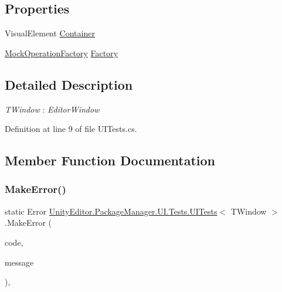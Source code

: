 \subsection*{Properties}
\begin{DoxyCompactItemize}
\item 
Visual\+Element \mbox{\hyperlink{class_unity_editor_1_1_package_manager_1_1_u_i_1_1_tests_1_1_u_i_tests_a85feae7c0dc564b712cab9392bd14e68}{Container}}
\item 
\mbox{\hyperlink{class_unity_editor_1_1_package_manager_1_1_u_i_1_1_tests_1_1_mock_operation_factory}{Mock\+Operation\+Factory}} \mbox{\hyperlink{class_unity_editor_1_1_package_manager_1_1_u_i_1_1_tests_1_1_u_i_tests_a21922bd694662931ee9b893f1734305f}{Factory}}
\end{DoxyCompactItemize}


\subsection{Detailed Description}
\begin{Desc}
\item[Type Constraints]\begin{description}
\item[{\em T\+Window} : {\em Editor\+Window}]\end{description}
\end{Desc}


Definition at line 9 of file U\+I\+Tests.\+cs.



\subsection{Member Function Documentation}
\mbox{\label{class_unity_editor_1_1_package_manager_1_1_u_i_1_1_tests_1_1_u_i_tests_a87def7aa22c1e0676f7621df8b18594e}} 
\subsubsection{\texorpdfstring{MakeError()}{MakeError()}}
{\footnotesize\ttfamily static Error \mbox{\hyperlink{class_unity_editor_1_1_package_manager_1_1_u_i_1_1_tests_1_1_u_i_tests}{Unity\+Editor.\+Package\+Manager.\+U\+I.\+Tests.\+U\+I\+Tests}}$<$ T\+Window $>$.Make\+Error (\begin{DoxyParamCaption}\item[{Error\+Code}]{code,  }\item[{string}]{message }\end{DoxyParamCaption})\hspace{0.3cm}{\ttfamily [static]}, {\ttfamily [protected]}}



